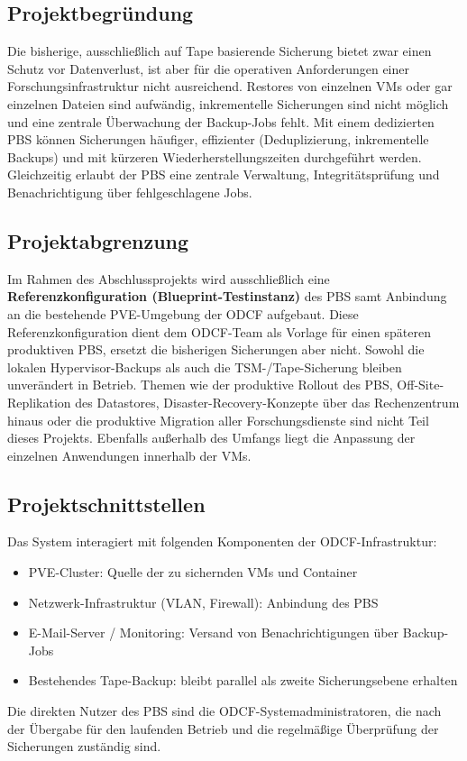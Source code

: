 \subsection{Projektbegründung}
\label{sec:Projektbegruendung}
Die bisherige, ausschließlich auf Tape basierende Sicherung bietet zwar
einen Schutz vor Datenverlust, ist aber für die operativen Anforderungen
einer Forschungsinfrastruktur nicht ausreichend.
Restores von einzelnen \acp{VM} oder gar einzelnen Dateien sind aufwändig,
inkrementelle Sicherungen sind nicht möglich und eine zentrale Überwachung
der Backup-Jobs fehlt.
Mit einem dedizierten \acl{PBS} können Sicherungen häufiger,
effizienter (Deduplizierung, inkrementelle Backups) und mit
kürzeren Wiederherstellungszeiten durchgeführt werden.
Gleichzeitig erlaubt der \ac{PBS} eine zentrale Verwaltung,
Integritätsprüfung und Benachrichtigung über fehlgeschlagene Jobs.

\subsection{Projektabgrenzung}
\label{sec:Projektabgrenzung}
Im Rahmen des Abschlussprojekts wird ausschließlich eine
\textbf{Referenzkonfiguration (Blueprint-Testinstanz)} des \acl{PBS} samt Anbindung an die
bestehende \ac{PVE}-Umgebung der \ac{ODCF} aufgebaut.
Diese Referenzkonfiguration dient dem \ac{ODCF}-Team als Vorlage für
einen späteren produktiven \ac{PBS}, ersetzt die bisherigen
Sicherungen aber nicht. Sowohl die lokalen Hypervisor-Backups als
auch die \ac{TSM}-/Tape-Sicherung bleiben unverändert in Betrieb.
Themen wie der produktive Rollout des \ac{PBS}, Off-Site-Replikation
des Datastores, Disaster-Recovery-Konzepte über das Rechenzentrum
hinaus oder die produktive Migration aller Forschungsdienste sind
nicht Teil dieses Projekts.
Ebenfalls außerhalb des Umfangs liegt die Anpassung der einzelnen
Anwendungen innerhalb der \acp{VM}.

\subsection{Projektschnittstellen}
\label{sec:Projektschnittstellen}
Das System interagiert mit folgenden Komponenten der \ac{ODCF}-Infrastruktur:
\begin{itemize}
    \item \acl{PVE}-Cluster: Quelle der zu sichernden \acp{VM} und Container
    \item Netzwerk-Infrastruktur (\ac{VLAN}, Firewall): Anbindung des \ac{PBS}
    \item E-Mail-Server / Monitoring: Versand von Benachrichtigungen über Backup-Jobs
    \item Bestehendes Tape-Backup: bleibt parallel als zweite Sicherungsebene erhalten
\end{itemize}
Die direkten Nutzer des \ac{PBS} sind die \ac{ODCF}-Systemadministratoren,
die nach der Übergabe für den laufenden Betrieb und die regelmäßige
Überprüfung der Sicherungen zuständig sind.

